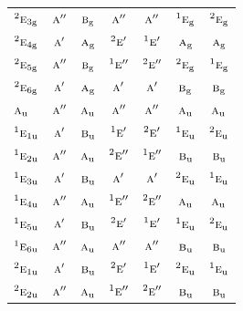 \documentclass[10pt,a4paper]{article}
\numberwithin{equation}{section}
\newcommand{\irr}[1]{\text{\normalfont\scshape #1}}
\newcommand{\conjpair}[1]{{}^{#1}}
\newcommand{\ptag}[1]{\mathrm{#1}}
\begin{document}
{\begin{longtable}{@{}lcccccc@{}}
$\conjpair{2}\irr{e}_{3\ptag{g}}$ & $\irr{a}''$ & $\irr{b}_{\ptag{g}}$ & $\irr{a}''$ & $\irr{a}''$ & $\conjpair{1}\irr{e}_{\ptag{g}}$ & $\conjpair{2}\irr{e}_{\ptag{g}}$\\
$\conjpair{2}\irr{e}_{4\ptag{g}}$ & $\irr{a}'$ & $\irr{a}_{\ptag{g}}$ & $\conjpair{2}\irr{e}'$ & $\conjpair{1}\irr{e}'$ & $\irr{a}_{\ptag{g}}$ & $\irr{a}_{\ptag{g}}$\\
$\conjpair{2}\irr{e}_{5\ptag{g}}$ & $\irr{a}''$ & $\irr{b}_{\ptag{g}}$ & $\conjpair{1}\irr{e}''$ & $\conjpair{2}\irr{e}''$ & $\conjpair{2}\irr{e}_{\ptag{g}}$ & $\conjpair{1}\irr{e}_{\ptag{g}}$\\
$\conjpair{2}\irr{e}_{6\ptag{g}}$ & $\irr{a}'$ & $\irr{a}_{\ptag{g}}$ & $\irr{a}'$ & $\irr{a}'$ & $\irr{b}_{\ptag{g}}$ & $\irr{b}_{\ptag{g}}$\\
$\irr{a}_{\ptag{u}}$ & $\irr{a}''$ & $\irr{a}_{\ptag{u}}$ & $\irr{a}''$ & $\irr{a}''$ & $\irr{a}_{\ptag{u}}$ & $\irr{a}_{\ptag{u}}$\\
$\conjpair{1}\irr{e}_{1\ptag{u}}$ & $\irr{a}'$ & $\irr{b}_{\ptag{u}}$ & $\conjpair{1}\irr{e}'$ & $\conjpair{2}\irr{e}'$ & $\conjpair{1}\irr{e}_{\ptag{u}}$ & $\conjpair{2}\irr{e}_{\ptag{u}}$\\
$\conjpair{1}\irr{e}_{2\ptag{u}}$ & $\irr{a}''$ & $\irr{a}_{\ptag{u}}$ & $\conjpair{2}\irr{e}''$ & $\conjpair{1}\irr{e}''$ & $\irr{b}_{\ptag{u}}$ & $\irr{b}_{\ptag{u}}$\\
$\conjpair{1}\irr{e}_{3\ptag{u}}$ & $\irr{a}'$ & $\irr{b}_{\ptag{u}}$ & $\irr{a}'$ & $\irr{a}'$ & $\conjpair{2}\irr{e}_{\ptag{u}}$ & $\conjpair{1}\irr{e}_{\ptag{u}}$\\
$\conjpair{1}\irr{e}_{4\ptag{u}}$ & $\irr{a}''$ & $\irr{a}_{\ptag{u}}$ & $\conjpair{1}\irr{e}''$ & $\conjpair{2}\irr{e}''$ & $\irr{a}_{\ptag{u}}$ & $\irr{a}_{\ptag{u}}$\\
$\conjpair{1}\irr{e}_{5\ptag{u}}$ & $\irr{a}'$ & $\irr{b}_{\ptag{u}}$ & $\conjpair{2}\irr{e}'$ & $\conjpair{1}\irr{e}'$ & $\conjpair{1}\irr{e}_{\ptag{u}}$ & $\conjpair{2}\irr{e}_{\ptag{u}}$\\
$\conjpair{1}\irr{e}_{6\ptag{u}}$ & $\irr{a}''$ & $\irr{a}_{\ptag{u}}$ & $\irr{a}''$ & $\irr{a}''$ & $\irr{b}_{\ptag{u}}$ & $\irr{b}_{\ptag{u}}$\\
$\conjpair{2}\irr{e}_{1\ptag{u}}$ & $\irr{a}'$ & $\irr{b}_{\ptag{u}}$ & $\conjpair{2}\irr{e}'$ & $\conjpair{1}\irr{e}'$ & $\conjpair{2}\irr{e}_{\ptag{u}}$ & $\conjpair{1}\irr{e}_{\ptag{u}}$\\
$\conjpair{2}\irr{e}_{2\ptag{u}}$ & $\irr{a}''$ & $\irr{a}_{\ptag{u}}$ & $\conjpair{1}\irr{e}''$ & $\conjpair{2}\irr{e}''$ & $\irr{b}_{\ptag{u}}$ & $\irr{b}_{\ptag{u}}$\\

\end{longtable}}
\end{document}
